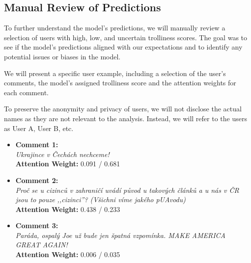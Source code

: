 \documentclass[twoside]{ctuthesis}
\theoremstyle{plain}
\theoremstyle{definition}
\theoremstyle{note}
\begin{document}
\subsection{Manual Review of Predictions}
To further understand the model's predictions, we will manually review a selection of users with high, low, and uncertain trolliness scores. The goal was to see if the model's predictions aligned with our expectations and to identify any potential issues or biases in the model.\par
We will present a specific user example, including a selection of the user's comments, the model's assigned trolliness score and the attention weights for each comment. \par
To preserve the anonymity and privacy of users, we will not disclose the actual names as they are not relevant to the analysis. Instead, we will refer to the users as User A, User B, etc.\par

\begin{tcolorbox}[colback=white, colframe=black, title=User A - Trolliness Score: 0.268 (Multilingual Model) / 0.960 (Russian Model)]
\begin{itemize}
    \item \textbf{Comment 1:} \\
    \textit{Ukrajince v Čechách nechceme!} \\
    \textbf{Attention Weight:} 0.091 / 0.681

    \vspace{0.2cm}

    \item \textbf{Comment 2:} \\
    \textit{Proč se u cizinců v zahraničí uvádí původ u takových článků a u nás v ČR jsou to pouze ,,cizinci''? (Všichni víme jakého pUAvodu)} \\
    \textbf{Attention Weight:} 0.438 / 0.233

    \vspace{0.2cm}

    \item \textbf{Comment 3:} \\
    \textit{Paráda, ospalý Joe už bude jen špatná vzpomínka. MAKE AMERICA GREAT AGAIN!} \\
    \textbf{Attention Weight:} 0.006 / 0.035
\end{itemize}
\end{tcolorbox}
\end{document}
